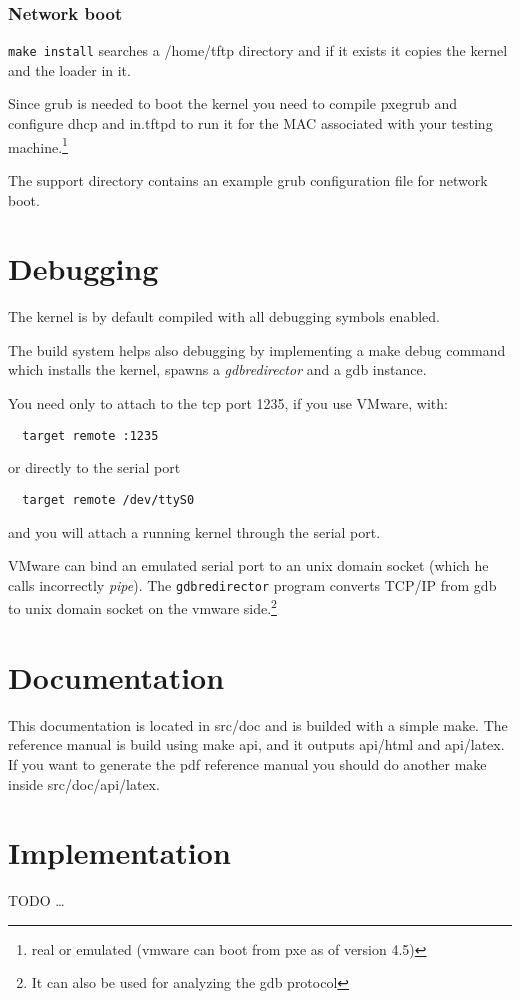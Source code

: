 \subsubsection{Network boot}

\texttt{make install} searches a \textsf{/home/tftp} directory and if it exists
it copies the kernel and the loader in it. 

Since grub is needed to boot the kernel you need to compile \textsf{pxegrub} and 
configure \textsf{dhcp} and \textsf{in.tftpd} to run it for the MAC associated
with your testing machine.\footnote{real or emulated (vmware can boot from pxe as of version 4.5)}

The \textsf{support} directory contains an example grub configuration file for network boot.

\section{Debugging}

The kernel is by default compiled with all debugging symbols enabled.

The build system helps also debugging by implementing a \textsf{make debug} command
which installs the kernel, spawns a \emph{gdbredirector} and a gdb instance.

You need only to attach to the tcp port 1235, if you use VMware, with:

\begin{verbatim}
  target remote :1235
\end{verbatim}

\noindent or directly to the serial port

\begin{verbatim}
  target remote /dev/ttyS0
\end{verbatim}

\noindent and you will attach a running kernel through the serial port.

VMware can bind an emulated serial port to an unix domain socket (which he calls incorrectly \emph{pipe}). The \texttt{gdbredirector} program converts TCP/IP from gdb to unix domain socket on the vmware side.\footnote{It can also be used for analyzing the gdb protocol}

\section{Documentation}

This documentation is located in \textsf{src/doc} and is builded with a simple \textsf{make}.
The reference manual is build using \textsf{make api}, and it outputs \textsf{api/html} and \textsf{api/latex}. If you want to generate the pdf reference manual you should do another \textsf{make} inside \textsf{src/doc/api/latex}.

\section{Implementation}

TODO \ldots

